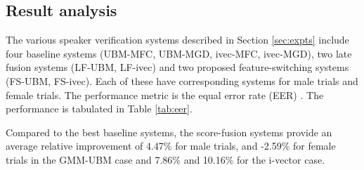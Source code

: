 \documentclass[preprint,12pt,5p]{elsarticle}
\begin{document}
\subsection{Result analysis}
\label{subsec:resAnalysis}

The various speaker verification systems described in Section \ref{sec:expts} 
include four baseline systems (UBM-MFC, UBM-MGD, ivec-MFC, ivec-MGD), 
two late fusion systems (LF-UBM, LF-ivec) 
and two proposed feature-switching systems (FS-UBM, FS-ivec). Each of these have 
corresponding systems for male trials and female trials. The performance metric 
is the equal error rate (EER) \cite{eer1}. The performance is tabulated in Table \ref{tab:eer}.


Compared to the best baseline systems, the score-fusion systems provide an average relative 
improvement of 4.47\% for male trials, and -2.59\% for female trials in the GMM-UBM case and 
7.86\% and 10.16\% for the i-vector case. 
\end{document}

